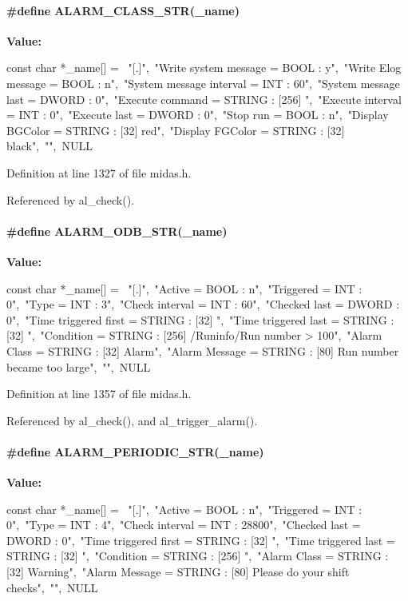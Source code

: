 \paragraph[{ALARM\_\-CLASS\_\-STR}]{\setlength{\rightskip}{0pt plus 5cm}\#define ALARM\_\-CLASS\_\-STR(\_\-name)}\hfill\label{group__malarmh_ga6e3217ec92c923301ce6ab366561c06c}
{\bfseries Value:}
\begin{DoxyCode}
const char *_name[] = {\
"[.]",\
"Write system message = BOOL : y",\
"Write Elog message = BOOL : n",\
"System message interval = INT : 60",\
"System message last = DWORD : 0",\
"Execute command = STRING : [256] ",\
"Execute interval = INT : 0",\
"Execute last = DWORD : 0",\
"Stop run = BOOL : n",\
"Display BGColor = STRING : [32] red",\
"Display FGColor = STRING : [32] black",\
"",\
NULL }
\end{DoxyCode}


Definition at line 1327 of file midas.h.

Referenced by al\_\-check().
\paragraph[{ALARM\_\-ODB\_\-STR}]{\setlength{\rightskip}{0pt plus 5cm}\#define ALARM\_\-ODB\_\-STR(\_\-name)}\hfill\label{group__malarmh_ga74ef6be93ea17e528cfffabf646075f1}
{\bfseries Value:}
\begin{DoxyCode}
const char *_name[] = {\
"[.]",\
"Active = BOOL : n",\
"Triggered = INT : 0",\
"Type = INT : 3",\
"Check interval = INT : 60",\
"Checked last = DWORD : 0",\
"Time triggered first = STRING : [32] ",\
"Time triggered last = STRING : [32] ",\
"Condition = STRING : [256] /Runinfo/Run number > 100",\
"Alarm Class = STRING : [32] Alarm",\
"Alarm Message = STRING : [80] Run number became too large",\
"",\
NULL }
\end{DoxyCode}


Definition at line 1357 of file midas.h.

Referenced by al\_\-check(), and al\_\-trigger\_\-alarm().
\paragraph[{ALARM\_\-PERIODIC\_\-STR}]{\setlength{\rightskip}{0pt plus 5cm}\#define ALARM\_\-PERIODIC\_\-STR(\_\-name)}\hfill\label{group__malarmh_ga32ee832ef89f8b42e0cb0f6c0b8a51b7}
{\bfseries Value:}
\begin{DoxyCode}
const char *_name[] = {\
"[.]",\
"Active = BOOL : n",\
"Triggered = INT : 0",\
"Type = INT : 4",\
"Check interval = INT : 28800",\
"Checked last = DWORD : 0",\
"Time triggered first = STRING : [32] ",\
"Time triggered last = STRING : [32] ",\
"Condition = STRING : [256] ",\
"Alarm Class = STRING : [32] Warning",\
"Alarm Message = STRING : [80] Please do your shift checks",\
"",\
NULL }
\end{DoxyCode}


